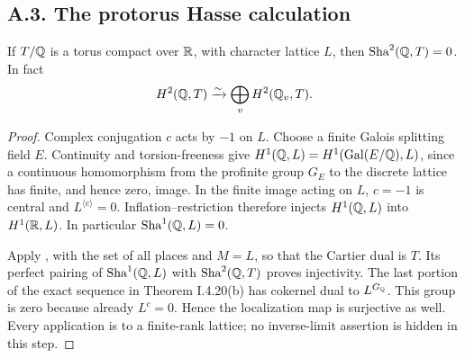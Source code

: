 \subsection{A.3. The protorus Hasse calculation}

\begin{lemma}
\label{A:compacthasse}
If $T/\mathbb Q$ is a torus compact over $\mathbb R$, with character lattice
$L$, then $\mathop{\mathrm{Sha}}^2(\mathbb Q,T)=0$. In fact
\[
 H^2(\mathbb Q,T)\xrightarrow{\sim}\bigoplus_v H^2(\mathbb Q_v,T).
\]
\end{lemma}
\begin{proof}
Complex conjugation $c$ acts by $-1$ on $L$. Choose a finite
Galois splitting field $E$. Continuity and torsion-freeness give
$H^1(\mathbb Q,L)=H^1(\operatorname{Gal}(E/\mathbb Q),L)$, since a continuous homomorphism
from the profinite group $G_E$ to the discrete lattice has finite,
and hence zero, image. In the finite image acting on $L$, $c=-1$
is central and $L^{\langle c\rangle}=0$. Inflation--restriction
therefore injects $H^1(\mathbb Q,L)$ into $H^1(\mathbb R,L)$.
In particular $\mathop{\mathrm{Sha}}^1(\mathbb Q,L)=0$.

Apply \citet[Theorem I.4.20(a)]{AMilneADT}, with the set of all
places and $M=L$, so that the Cartier dual is $T$. Its perfect
pairing of $\mathop{\mathrm{Sha}}^1(\mathbb Q,L)$ with $\mathop{\mathrm{Sha}}^2(\mathbb Q,T)$ proves
injectivity. The last portion of the exact sequence in
Theorem I.4.20(b) has cokernel dual to $L^{G_\mathbb Q}$.
This group is zero because already $L^c=0$. Hence the localization
map is surjective as well. Every application is to a finite-rank
lattice; no inverse-limit assertion is hidden in this step.
\end{proof}

